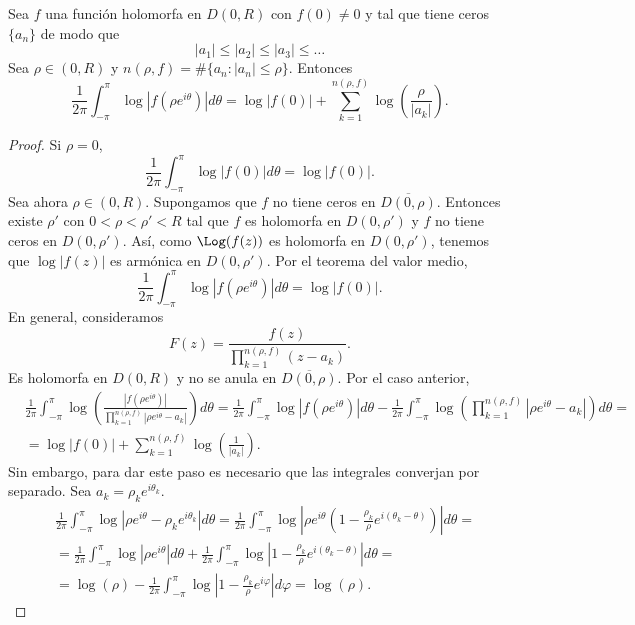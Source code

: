 \begin{theorem}
    Sea $f$ una función holomorfa en $D(0, R)$ con $f(0) \neq 0$ y tal que tiene ceros $\{a_n\}$ de modo que
    $$|a_1| \leq |a_2| \leq |a_3| \leq \dots$$
    Sea $\rho \in (0, R)$ y $n(\rho, f) = \#\{a_n : |a_n| \leq \rho\}$.
    Entonces
    $$\frac{1}{2\pi} \int_{-\pi}^\pi \log|f(\rho e^{i\theta})|d\theta = \log|f(0)| + \sum_{k=1}^{n(\rho, f)} \log\left(\frac{\rho}{|a_k|}\right).$$
\end{theorem}

\begin{proof}
    Si $\rho = 0$,
    $$\frac{1}{2\pi} \int_{-\pi}^\pi \log|f(0)|d\theta = \log|f(0)|.$$
    Sea ahora $\rho \in (0, R)$.
    Supongamos que $f$ no tiene ceros en $\overline{D(0, \rho)}$.
    Entonces existe $\rho'$ con $0 < \rho < \rho' < R$ tal que $f$ es holomorfa en $D(0, \rho')$ y $f$ no tiene ceros en $D(0, \rho')$.
    Así, como $\Log(f(z))$ es holomorfa en $D(0, \rho')$, tenemos que $\log|f(z)|$ es armónica en $D(0, \rho')$.
    Por el teorema del valor medio,
    $$\frac{1}{2\pi} \int_{-\pi}^\pi \log|f(\rho e^{i\theta})|d\theta = \log|f(0)|.$$
    En general, consideramos
    $$F(z) = \frac{f(z)}{\prod_{k=1}^{n(\rho, f)} (z-a_k)}.$$
    Es holomorfa en $D(0, R)$ y no se anula en $\overline{D(0, \rho)}$.
    Por el caso anterior,
    \begin{align*}
         & \frac{1}{2\pi} \int_{-\pi}^\pi \log\left(\frac{|f(\rho e^{i\theta})|}{\prod_{k=1}^{n(\rho, f)} |\rho e^{i\theta} - a_k|}\right)d\theta = \frac{1}{2\pi} \int_{-\pi}^\pi \log|f(\rho e^{i\theta})|d\theta - \frac{1}{2\pi} \int_{-\pi}^\pi \log\left(\prod_{k=1}^{n(\rho, f)} |\rho e^{i\theta} - a_k|\right)d\theta = \\
         & = \log|f(0)| + \sum_{k=1}^{n(\rho, f)} \log\left(\frac{1}{|a_k|}\right).
    \end{align*}
    Sin embargo, para dar este paso es necesario que las integrales converjan por separado.
    Sea $a_k = \rho_ke^{i\theta_k}$.
    \begin{align*}
         & \frac{1}{2\pi} \int_{-\pi}^\pi \log|\rho e^{i\theta} - \rho_ke^{i\theta_k}|d\theta = \frac{1}{2\pi} \int_{-\pi}^\pi \log\left|\rho e^{i\theta}\left(1-\frac{\rho_k}{\rho}e^{i(\theta_k-\theta)}\right)\right|d\theta = \\
         & = \frac{1}{2\pi} \int_{-\pi}^\pi \log|\rho e^{i\theta}|d\theta + \frac{1}{2\pi} \int_{-\pi}^\pi \log\left|1-\frac{\rho_k}{\rho}e^{i(\theta_k-\theta)}\right|d\theta =                                                  \\
         & = \log(\rho) - \frac{1}{2\pi} \int_{-\pi}^\pi \log\left|1-\frac{\rho_k}{\rho}e^{i\varphi}\right|d\varphi = \log(\rho).
    \end{align*}
\end{proof}

